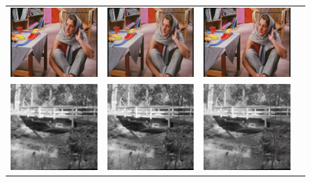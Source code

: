 \documentclass[10pt,twocolumn,letterpaper]{article}
\begin{document}
\begin{figure}[h!]
\begin{tabular}{cccc}
\includegraphics[width=1.5in]{images/used/appendix/jpg/Set14/barbara_SRResNet-MSE} &
\includegraphics[width=1.5in]{images/used/appendix/jpg/Set14/barbara_SRGAN-VGG54} &
\includegraphics[width=1.5in]{images/used/appendix/jpg/Set14/barbara_HR} \\
\includegraphics[width=1.5in]{images/used/appendix/jpg/Set14/bridge_bicubic}&
\includegraphics[width=1.5in]{images/used/appendix/jpg/Set14/bridge_SRResNet-MSE} &
\includegraphics[width=1.5in]{images/used/appendix/jpg/Set14/bridge_SRGAN-VGG54} &

\end{tabular}
\end{figure}
\end{document}
